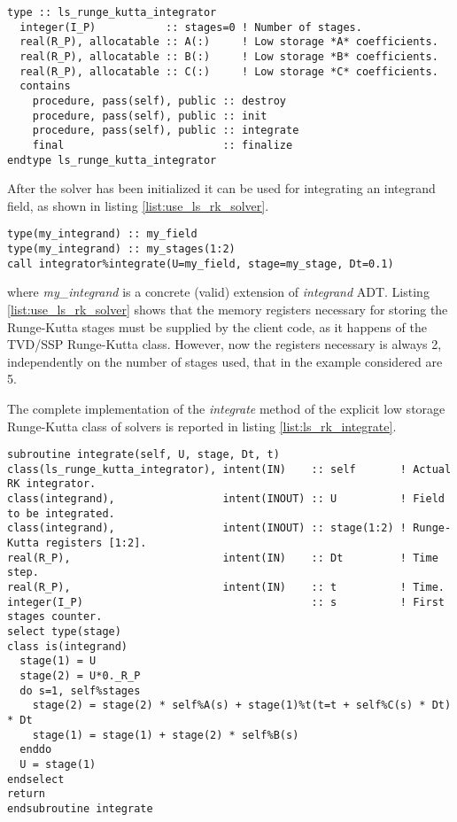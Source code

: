 \begin{lstlisting}[firstnumber=1,style=code,caption={definition of \emph{ls\_runge\_kutta\_integrator} type},label={list:ls_rk_solver}]
type :: ls_runge_kutta_integrator
  integer(I_P)           :: stages=0 ! Number of stages.
  real(R_P), allocatable :: A(:)     ! Low storage *A* coefficients.
  real(R_P), allocatable :: B(:)     ! Low storage *B* coefficients.
  real(R_P), allocatable :: C(:)     ! Low storage *C* coefficients.
  contains
    procedure, pass(self), public :: destroy
    procedure, pass(self), public :: init
    procedure, pass(self), public :: integrate
    final                         :: finalize
endtype ls_runge_kutta_integrator
\end{lstlisting}

After the solver has been initialized it can be used for integrating an integrand field, as shown in listing \ref{list:use_ls_rk_solver}.

\begin{lstlisting}[firstnumber=1,style=code,caption={example of usage of a low storage Runge-Kutta integrator},label={list:use_ls_rk_solver}]
type(my_integrand) :: my_field
type(my_integrand) :: my_stages(1:2)
call integrator%integrate(U=my_field, stage=my_stage, Dt=0.1)
\end{lstlisting}
where \emph{my\_integrand} is a concrete (valid) extension of \emph{integrand} ADT. Listing \ref{list:use_ls_rk_solver} shows that the memory registers necessary for storing the Runge-Kutta stages must be supplied by the client code, as it happens of the TVD/SSP Runge-Kutta class. However, now the registers necessary is always 2, independently on the number of stages used, that in the example considered are 5.

The complete implementation of the \emph{integrate} method of the explicit low storage Runge-Kutta class of solvers is reported in listing \ref{list:ls_rk_integrate}.

\begin{lstlisting}[firstnumber=1,style=code,caption={implementation of the \emph{integrate} method of explicit low storage Runge-Kutta class},label={list:ls_rk_integrate}]
subroutine integrate(self, U, stage, Dt, t)
class(ls_runge_kutta_integrator), intent(IN)    :: self       ! Actual RK integrator.
class(integrand),                 intent(INOUT) :: U          ! Field to be integrated.
class(integrand),                 intent(INOUT) :: stage(1:2) ! Runge-Kutta registers [1:2].
real(R_P),                        intent(IN)    :: Dt         ! Time step.
real(R_P),                        intent(IN)    :: t          ! Time.
integer(I_P)                                    :: s          ! First stages counter.
select type(stage)
class is(integrand)
  stage(1) = U
  stage(2) = U*0._R_P
  do s=1, self%stages
    stage(2) = stage(2) * self%A(s) + stage(1)%t(t=t + self%C(s) * Dt) * Dt
    stage(1) = stage(1) + stage(2) * self%B(s)
  enddo
  U = stage(1)
endselect
return
endsubroutine integrate
\end{lstlisting}

